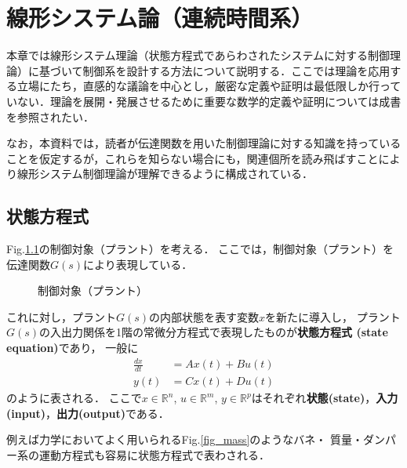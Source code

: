 \chapter{線形システム論（連続時間系） \label{sec_cont_sys}}

本章では線形システム理論（状態方程式であらわされたシステムに対する制御理論）に基づいて制御系を設計する方法について説明する．ここでは理論を応用する立場にたち，直感的な議論を中心とし，厳密な定義や証明は最低限しか行っていない．理論を展開・発展させるために重要な数学的定義や証明については成書を参照されたい．

なお，本資料では，読者が伝達関数を用いた制御理論に対する知識を持っていることを仮定するが，これらを知らない場合にも，関連個所を読み飛ばすことにより線形システム制御理論が理解できるように構成されている．

\section{状態方程式}
Fig.\ref{fig:feedback}の制御対象（プラント）を考える．
ここでは，制御対象（プラント）を伝達関数$G(s)$により表現している．

\begin{figure}[htbp]
 \begin{center}
  \caption{制御対象（プラント）}
  \label{fig:feedback}
 \end{center}
\end{figure}

これに対し，プラント$G(s)$の内部状態を表す変数$x$を新たに導入し，
プラント$G(s)$の入出力関係を1階の常微分方程式で表現したものが{\bf {状態方程式} (state equation)}であり，
一般に
\begin{align}
 \frac{dx}{dt} &= A x(t) + B u(t) \label{state_eq} \\
 y(t) &= C x(t) + D u(t) \label{output_eq}
\end{align}
のように表される．
ここで$x \in {\mathbb R}^n$, $ u \in {\mathbb R}^m $, $ y \in {\mathbb
R}^p $はそれぞれ{\bf {状態}(state)}，{\bf {入力}(input)}，{\bf {出力}(output)}である．

例えば力学においてよく用いられるFig.\ref{fig_mass}のようなバネ・
質量・ダンパー系の運動方程式も容易に状態方程式で表わされる．

